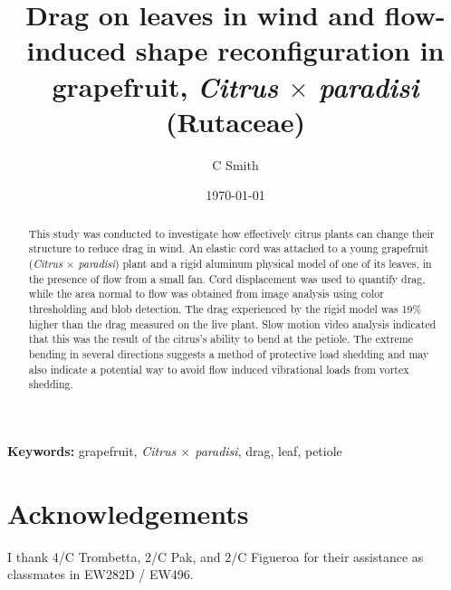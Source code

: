 \documentclass[]{article}
\title{Drag on leaves in wind and flow-induced shape reconfiguration in grapefruit, {\emph{Citrus $\times$ paradisi}} (Rutaceae)}
\author{C Smith}
\date{\today}
\newcommand{\Citrusxparadisi}{\emph{Citrus $\times$ paradisi}}
\begin{document}
\maketitle
\begin{abstract}
This study was conducted to investigate how effectively citrus plants can change their structure to reduce drag in wind. An elastic cord was attached to a young grapefruit (\Citrusxparadisi) plant and a rigid aluminum physical model of one of its leaves, in the presence of flow from a small fan.  Cord displacement was used to quantify drag, while the area normal to flow was obtained from image analysis using color thresholding and blob detection. The drag experienced by the rigid model was 19\% higher than the drag measured on the live plant. Slow motion video analysis indicated that this was the result of the citrus's ability to bend at the petiole. The extreme bending in several directions suggests a method of protective load shedding and may also indicate a potential way to avoid flow induced vibrational loads from vortex shedding.
\end{abstract}
{\scriptsize\textbf{Keywords: }grapefruit, \Citrusxparadisi, drag, leaf, petiole}


\section{Acknowledgements}
I thank 4/C Trombetta, 2/C Pak, and 2/C Figueroa for their assistance as classmates in EW282D / EW496. 



\clearpage
\appendix
\renewcommand{\figurename}{Supplementary Figure}
\renewcommand{\thefigure}{S\arabic{figure}}

\end{document}
